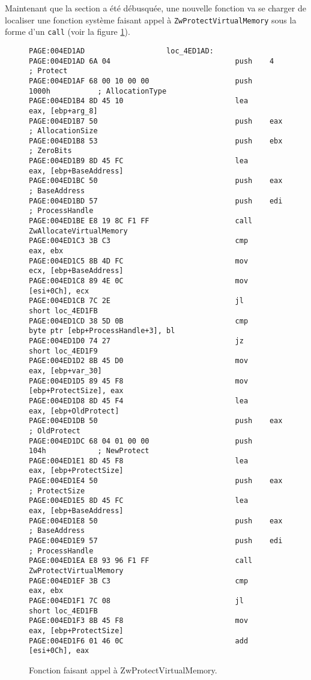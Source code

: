 \documentclass[times,11pt,fullpage]{article}
\begin{document}
Maintenant que la section a été débusquée, une nouvelle fonction va se charger de localiser une fonction système faisant appel à \texttt{ZwProtectVirtualMemory} sous la forme d'un \texttt{call} (voir la figure \ref{fig:CallZwProtect}).

\begin{figure}
\scriptsize
\begin{framed}
\begin{verbatim}
PAGE:004ED1AD                   loc_4ED1AD:                             
PAGE:004ED1AD 6A 04                             push    4               ; Protect
PAGE:004ED1AF 68 00 10 00 00                    push    1000h           ; AllocationType
PAGE:004ED1B4 8D 45 10                          lea     eax, [ebp+arg_8]
PAGE:004ED1B7 50                                push    eax             ; AllocationSize
PAGE:004ED1B8 53                                push    ebx             ; ZeroBits
PAGE:004ED1B9 8D 45 FC                          lea     eax, [ebp+BaseAddress]
PAGE:004ED1BC 50                                push    eax             ; BaseAddress
PAGE:004ED1BD 57                                push    edi             ; ProcessHandle
PAGE:004ED1BE E8 19 8C F1 FF                    call    ZwAllocateVirtualMemory
PAGE:004ED1C3 3B C3                             cmp     eax, ebx
PAGE:004ED1C5 8B 4D FC                          mov     ecx, [ebp+BaseAddress]
PAGE:004ED1C8 89 4E 0C                          mov     [esi+0Ch], ecx
PAGE:004ED1CB 7C 2E                             jl      short loc_4ED1FB
PAGE:004ED1CD 38 5D 0B                          cmp     byte ptr [ebp+ProcessHandle+3], bl
PAGE:004ED1D0 74 27                             jz      short loc_4ED1F9
PAGE:004ED1D2 8B 45 D0                          mov     eax, [ebp+var_30]
PAGE:004ED1D5 89 45 F8                          mov     [ebp+ProtectSize], eax
PAGE:004ED1D8 8D 45 F4                          lea     eax, [ebp+OldProtect]
PAGE:004ED1DB 50                                push    eax             ; OldProtect
PAGE:004ED1DC 68 04 01 00 00                    push    104h            ; NewProtect
PAGE:004ED1E1 8D 45 F8                          lea     eax, [ebp+ProtectSize]
PAGE:004ED1E4 50                                push    eax             ; ProtectSize
PAGE:004ED1E5 8D 45 FC                          lea     eax, [ebp+BaseAddress]
PAGE:004ED1E8 50                                push    eax             ; BaseAddress
PAGE:004ED1E9 57                                push    edi             ; ProcessHandle
PAGE:004ED1EA E8 93 96 F1 FF                    call    ZwProtectVirtualMemory
PAGE:004ED1EF 3B C3                             cmp     eax, ebx
PAGE:004ED1F1 7C 08                             jl      short loc_4ED1FB
PAGE:004ED1F3 8B 45 F8                          mov     eax, [ebp+ProtectSize]
PAGE:004ED1F6 01 46 0C                          add     [esi+0Ch], eax
\end{verbatim}
\end{framed}
\caption{Fonction faisant appel à ZwProtectVirtualMemory.\label{fig:CallZwProtect}}
\end{figure}
\end{document}
